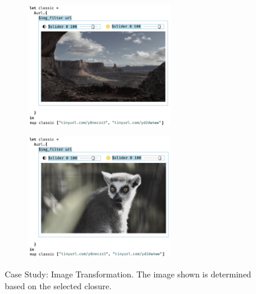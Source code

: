 \begin{figure}
  \begin{center}
    \begin{subfigure}[t]{0.5\textwidth}
      \centering
      \includegraphics[width=15pc]{img-filter-1.png}
      \caption{}
    \end{subfigure}\begin{subfigure}[t]{0.5\textwidth}
      \centering
      \includegraphics[width=15pc]{img-filter-2.png}
      \caption{}
    \end{subfigure}
  \end{center}
  \caption{Case Study: Image Transformation. The image shown is determined based on the selected closure.}
  \label{fig:img-transformation}
\end{figure}


